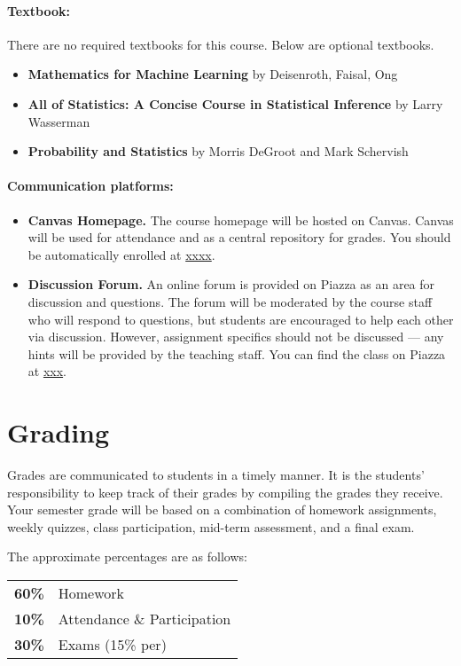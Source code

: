 \documentclass[12pt]{scrartcl}
\begin{document}
\paragraph{Textbook:} 
There are no required textbooks for this course. Below are optional textbooks. 
\begin{itemize}
\item \textbf{Mathematics for Machine Learning} by Deisenroth, Faisal, Ong
\item \textbf{All of Statistics: A Concise Course in Statistical Inference} by Larry Wasserman 
\item \textbf{Probability and Statistics} by Morris DeGroot and Mark Schervish
\end{itemize}

\paragraph{Communication platforms:}
\begin{itemize}
\item \textbf{Canvas Homepage.} 
The course homepage will be hosted on Canvas. 
Canvas will be used for attendance and as a central repository for grades. 
You should be automatically enrolled at \url{xxxx}.
\item \textbf{Discussion Forum.} 
An online forum is provided on Piazza as an area for discussion and questions. 
The forum will be moderated by the course staff who will respond to questions, 
but students are encouraged to help each other via discussion. 
However, assignment specifics should not be discussed --- 
any hints will be provided by the teaching staff. 
You can find the class on Piazza at \url{xxx}.
\end{itemize}

\section{Grading}

Grades are communicated to students in a timely manner. 
It is the students’ responsibility to keep track of their grades by compiling the grades they receive. 
Your semester grade will be based on a combination of homework assignments, weekly quizzes, class participation,  mid-term assessment, and a final exam. 

The approximate percentages are as follows:
\begin{center}
\begin{tabular}{rl}
\textbf{60\% } & Homework\\
\textbf{10\% } & Attendance \& Participation\\
\textbf{30\% } & Exams (15\% per)\\
\end{tabular}
\end{center}
\end{document}
